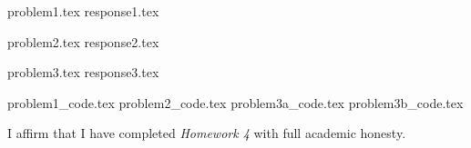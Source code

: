 \documentclass[letterpaper, 12pt]{article}
\begin{document}

{problem1.tex}
{response1.tex}

{problem2.tex}
{response2.tex}

{problem3.tex}
{response3.tex}

\appendix

{problem1_code.tex}
{problem2_code.tex}
{problem3a_code.tex}
{problem3b_code.tex}

\par

I affirm that I have completed \textit{Homework 4} with full academic honesty.
\end{document}
